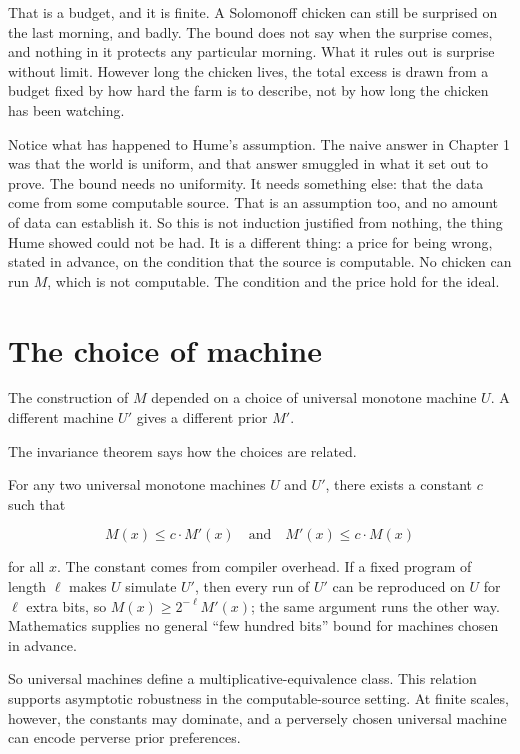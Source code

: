 That is a budget, and it is finite. A Solomonoff chicken can still be surprised on the last morning, and badly. The bound does not say when the surprise comes, and nothing in it protects any particular morning. What it rules out is surprise without limit. However long the chicken lives, the total excess is drawn from a budget fixed by how hard the farm is to describe, not by how long the chicken has been watching.

Notice what has happened to Hume's assumption. The naive answer in Chapter 1 was that the world is uniform, and that answer smuggled in what it set out to prove. The bound needs no uniformity. It needs something else: that the data come from some computable source. That is an assumption too, and no amount of data can establish it. So this is not induction justified from nothing, the thing Hume showed could not be had. It is a different thing: a price for being wrong, stated in advance, on the condition that the source is computable. No chicken can run $M$, which is not computable. The condition and the price hold for the ideal.

\section*{The choice of machine}

The construction of $M$ depended on a choice of universal monotone machine $U$. A different machine $U'$ gives a different prior $M'$.

The invariance theorem says how the choices are related.

For any two universal monotone machines $U$ and $U'$, there exists a constant $c$ such that

$$M(x) \leq c \cdot M'(x) \quad \text{and} \quad M'(x) \leq c \cdot M(x)$$

for all $x$. The constant comes from compiler overhead. If a fixed program of length $\ell$ makes $U$ simulate $U'$, then every run of $U'$ can be reproduced on $U$ for $\ell$ extra bits, so $M(x) \geq 2^{-\ell} M'(x)$; the same argument runs the other way. Mathematics supplies no general ``few hundred bits'' bound for machines chosen in advance.

So universal machines define a multiplicative-equivalence class. This relation supports asymptotic robustness in the computable-source setting. At finite scales, however, the constants may dominate, and a perversely chosen universal machine can encode perverse prior preferences.


